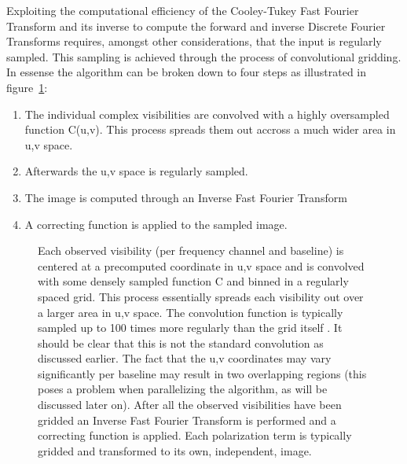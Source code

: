  Exploiting the computational efficiency of the Cooley-Tukey Fast Fourier Transform and its inverse to compute the forward and inverse Discrete Fourier Transforms requires, amongst other considerations, that
 the input is regularly sampled. This sampling is achieved through the process of convolutional gridding. In essense the algorithm can be broken down to four steps as illustrated in figure~\ref{fig_gridding}:
 \begin{enumerate}
  \item The individual complex visibilities are convolved with a highly oversampled function C(u,v). This process spreads them out accross a much wider area in u,v space.
  \item Afterwards the u,v space is regularly sampled.
  \item The image is computed through an Inverse Fast Fourier Transform
  \item A correcting function is applied to the sampled image.
 \end{enumerate}
 \begin{figure}[h]
  \begin{mdframed}
   \caption[Illustration of convolutional gridding]{Each observed visibility (per frequency channel and baseline) is centered at a precomputed coordinate in u,v space and is convolved with 
    some densely sampled function C and binned in a regularly spaced grid. This process essentially spreads each visibility out over a larger area in u,v space. The convolution function is typically sampled
    up to 100 times more regularly than the grid itself \cite{varbanescu2008performance,cornwell2007impact}. It should be clear that this is not the standard convolution as discussed earlier. The fact that the u,v coordinates may vary 
    significantly per baseline may result in two overlapping regions (this poses a problem when parallelizing the algorithm, as will be discussed later on). After all the observed visibilities have been gridded an 
    Inverse Fast Fourier Transform is performed and a correcting function is applied. Each polarization term is typically gridded and transformed to its own, independent, image.}
   \label{fig_gridding}
  \end{mdframed}
 \end{figure}
